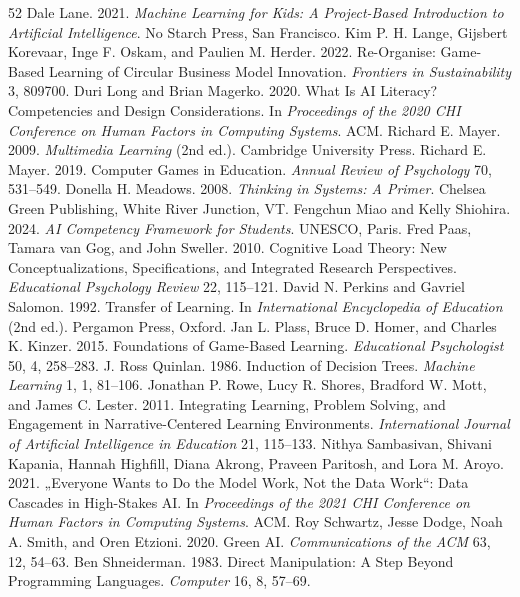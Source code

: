 \documentclass[sigconf,nonacm]{acmart}
\begin{document}
\begin{thebibliography}{52}
 Dale Lane. 2021. \textit{Machine Learning for Kids: A Project-Based Introduction to Artificial Intelligence}. No Starch Press, San Francisco.
 Kim P. H. Lange, Gijsbert Korevaar, Inge F. Oskam, and Paulien M. Herder. 2022. Re-Organise: Game-Based Learning of Circular Business Model Innovation. \textit{Frontiers in Sustainability} 3, 809700.
 Duri Long and Brian Magerko. 2020. What Is AI Literacy? Competencies and Design Considerations. In \textit{Proceedings of the 2020 CHI Conference on Human Factors in Computing Systems}. ACM.
 Richard E. Mayer. 2009. \textit{Multimedia Learning} (2nd ed.). Cambridge University Press.
 Richard E. Mayer. 2019. Computer Games in Education. \textit{Annual Review of Psychology} 70, 531--549.
 Donella H. Meadows. 2008. \textit{Thinking in Systems: A Primer}. Chelsea Green Publishing, White River Junction, VT.
 Fengchun Miao and Kelly Shiohira. 2024. \textit{AI Competency Framework for Students}. UNESCO, Paris.
 Fred Paas, Tamara van Gog, and John Sweller. 2010. Cognitive Load Theory: New Conceptualizations, Specifications, and Integrated Research Perspectives. \textit{Educational Psychology Review} 22, 115--121.
 David N. Perkins and Gavriel Salomon. 1992. Transfer of Learning. In \textit{International Encyclopedia of Education} (2nd ed.). Pergamon Press, Oxford.
 Jan L. Plass, Bruce D. Homer, and Charles K. Kinzer. 2015. Foundations of Game-Based Learning. \textit{Educational Psychologist} 50, 4, 258--283.
 J. Ross Quinlan. 1986. Induction of Decision Trees. \textit{Machine Learning} 1, 1, 81--106.
 Jonathan P. Rowe, Lucy R. Shores, Bradford W. Mott, and James C. Lester. 2011. Integrating Learning, Problem Solving, and Engagement in Narrative-Centered Learning Environments. \textit{International Journal of Artificial Intelligence in Education} 21, 115--133.
 Nithya Sambasivan, Shivani Kapania, Hannah Highfill, Diana Akrong, Praveen Paritosh, and Lora M. Aroyo. 2021. „Everyone Wants to Do the Model Work, Not the Data Work“: Data Cascades in High-Stakes AI. In \textit{Proceedings of the 2021 CHI Conference on Human Factors in Computing Systems}. ACM.
 Roy Schwartz, Jesse Dodge, Noah A. Smith, and Oren Etzioni. 2020. Green AI. \textit{Communications of the ACM} 63, 12, 54--63.
 Ben Shneiderman. 1983. Direct Manipulation: A Step Beyond Programming Languages. \textit{Computer} 16, 8, 57--69.

\end{thebibliography}
\end{document}
